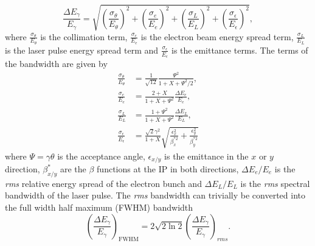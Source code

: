\documentclass[../main.tex]{subfiles}
\begin{document}
\begin{equation}
\frac{\Delta E_{\gamma}}{E_{\gamma}} = \sqrt{\left(\frac{\sigma_{\theta}}{E_{\theta}}\right)^{2}+\left(\frac{\sigma_{e}}{E_{e}}\right)^{2}+\left(\frac{\sigma_{L}}{E_{L}}\right)^{2}+\left(\frac{\sigma_{\epsilon}}{E_{\epsilon}}\right)^{2}},
\label{eq:RMS_bandwidth}    
\end{equation}
where $\frac{\sigma_{\theta}}{E_{\theta}}$ is the collimation term, $\frac{\sigma_{e}}{E_{e}}$ is the electron beam energy spread term, $\frac{\sigma_{L}}{E_{L}}$ is the laser pulse energy spread term and $\frac{\sigma_{\epsilon}}{E_{\epsilon}}$ is the emittance terms. The terms of the bandwidth are given by
\begin{align}
\frac{\sigma_{\theta}}{E_{\theta}} &= \frac{1}{\sqrt{12}}\frac{\Psi^{2}}{1+X+\Psi^{2}/2},
\label{eq:collimation_term} \\
\frac{\sigma_{e}}{E_{e}} &= \frac{2+X}{1+X+\Psi^{2}}\frac{\Delta E_{e}}{E_{e}},
\label{eq:beam_energy_spread_term} \\
\frac{\sigma_{L}}{E_{L}} &= \frac{1+\Psi^{2}}{1+X+\Psi^{2}}\frac{\Delta E_{L}}{E_{L}},
\label{eq:laser_energy_spread_term} \\
\frac{\sigma_{\epsilon}}{E_{\epsilon}} &= \frac{\sqrt{2}\gamma^{2}}{1+X}\sqrt{\frac{\epsilon_{x}^{2}}{\beta_{x}^{*2}}+\frac{\epsilon_{y}^{2}}{\beta_{y}^{*2}}}
\label{eq:emittance_term}
\end{align}
where $\Psi = \gamma\theta$ is the acceptance angle, $\epsilon_{x/y}$ is the emittance in the $x$ or $y$ direction, $\beta_{x/y}^{*}$ are the $\beta$ functions at the IP in both directions, $\Delta E_{e}/E_{e}$ is the \textit{rms} relative energy spread of the electron bunch and $\Delta E_{L}/E_{L}$ is the \textit{rms} spectral bandwidth of the laser pulse. The \textit{rms} bandwidth can trivially be converted into the full width half maximum (FWHM) bandwidth 
\begin{equation}
\left(\frac{\Delta E_{\gamma}}{E_{\gamma}}\right)_{\mathrm{FWHM}} = 2\sqrt{2\ln{2}}\left(\frac{\Delta E_{\gamma}}{E_{\gamma}}\right)_{rms}.
\label{eq:FWHM_bandwidth}
\end{equation}
\end{document}
